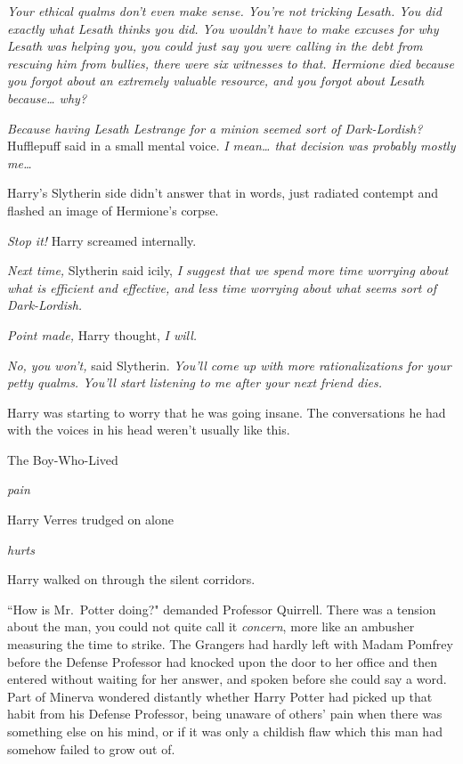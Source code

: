 \emph{Your ethical qualms don't even make sense. You're not tricking Lesath. You did exactly what Lesath thinks you did. You wouldn't have to make excuses for why Lesath was helping you, you could just say you were calling in the debt from rescuing him from bullies, there were six witnesses to that. Hermione died because you forgot about an extremely valuable resource, and you forgot about Lesath because{\ldots} why?}

\emph{Because having Lesath Lestrange for a minion seemed sort of Dark-Lordish?} Hufflepuff said in a small mental voice. \emph{I mean{\ldots} that decision was probably mostly me{\ldots}}

Harry's Slytherin side didn't answer that in words, just radiated contempt and flashed an image of Hermione's corpse.

\emph{Stop it!} Harry screamed internally.

\emph{Next time,} Slytherin said icily, \emph{I suggest that we spend more time worrying about what is efficient and effective, and less time worrying about what seems sort of Dark-Lordish.}

\emph{Point made,} Harry thought, \emph{I will.}

\emph{No, you won't,} said Slytherin. \emph{You'll come up with more rationalizations for your petty qualms. You'll start listening to me after your \emph{next} friend dies.}

Harry was starting to worry that he was going insane. The conversations he had with the voices in his head weren't usually like this.

The Boy-Who-Lived

\emph{pain}

Harry Verres trudged on alone

\emph{hurts}

Harry walked on through the silent corridors.

\later

``How is Mr.~Potter doing?" demanded Professor Quirrell. There was a tension about the man, you could not quite call it \emph{concern}, more like an ambusher measuring the time to strike. The Grangers had hardly left with Madam Pomfrey before the Defense Professor had knocked upon the door to her office and then entered without waiting for her answer, and spoken before she could say a word. Part of Minerva wondered distantly whether Harry Potter had picked up that habit from his Defense Professor, being unaware of others' pain when there was something else on his mind, or if it was only a childish flaw which this man had somehow failed to grow out of.

